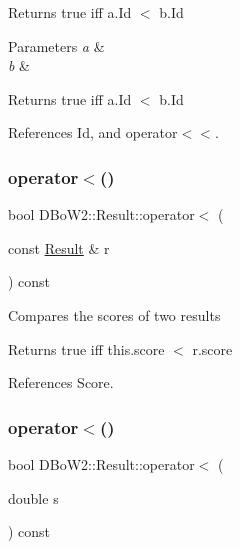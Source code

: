 Returns true iff a.\+Id $<$ b.\+Id 
\begin{DoxyParams}{Parameters}
{\em a} & \\
\hline
{\em b} & \\
\hline
\end{DoxyParams}
\begin{DoxyReturn}{Returns}
true iff a.\+Id $<$ b.\+Id 
\end{DoxyReturn}


References Id, and operator$<$$<$.

\mbox{\label{classDBoW2_1_1Result_a9157d6fdd9be3dcf83a17376cc702fbf}} 
\subsubsection{\texorpdfstring{operator$<$()}{operator<()}\hspace{0.1cm}{\footnotesize\ttfamily [1/2]}}
{\footnotesize\ttfamily bool D\+Bo\+W2\+::\+Result\+::operator$<$ (\begin{DoxyParamCaption}\item[{const \hyperlink{classDBoW2_1_1Result}{Result} \&}]{r }\end{DoxyParamCaption}) const\hspace{0.3cm}{\ttfamily [inline]}}

Compares the scores of two results \begin{DoxyReturn}{Returns}
true iff this.\+score $<$ r.\+score 
\end{DoxyReturn}


References Score.

\mbox{\label{classDBoW2_1_1Result_a930763f8645ee57a71835b7d9fa05ebc}} 
\subsubsection{\texorpdfstring{operator$<$()}{operator<()}\hspace{0.1cm}{\footnotesize\ttfamily [2/2]}}
{\footnotesize\ttfamily bool D\+Bo\+W2\+::\+Result\+::operator$<$ (\begin{DoxyParamCaption}\item[{double}]{s }\end{DoxyParamCaption}) const\hspace{0.3cm}{\ttfamily [inline]}}

